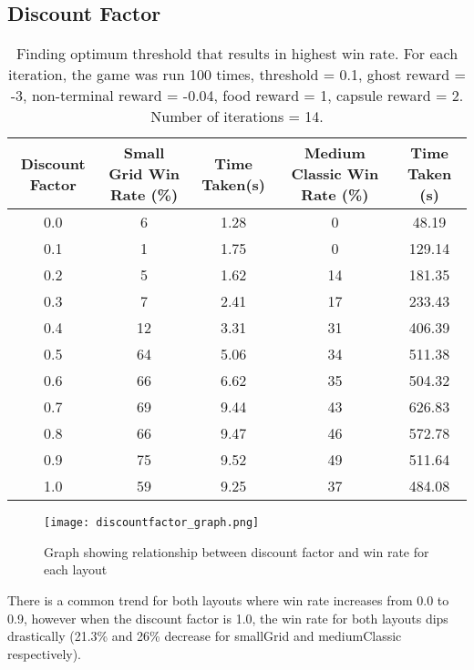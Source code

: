 \documentclass[12pt]{report}
\begin{document}
      \subsection*{Discount Factor}
        \begin{table}[H]
          \begin{center}
            \begin{adjustbox}{max width=\textwidth}
              \begin{tabular}{*{5}{c}}

                \textbf{Discount Factor} & \textbf{Small Grid Win Rate (\%)} & \textbf{Time Taken(s)} & \textbf{Medium Classic Win Rate (\%)} & \textbf{Time Taken (s)}\\
                \hline
                0.0 & 6 & 1.28 & 0 & 48.19\\
                0.1 & 1 & 1.75 & 0 & 129.14\\
                0.2 & 5 & 1.62 & 14 & 181.35\\
                0.3 & 7 & 2.41 & 17 & 233.43\\
                0.4 & 12 & 3.31 & 31 & 406.39\\
                0.5 & 64 & 5.06 & 34 & 511.38\\
                0.6 & 66 & 6.62 & 35 & 504.32\\
                0.7 & 69 & 9.44 & 43 & 626.83\\
                0.8 & 66 & 9.47 & 46 & 572.78\\
                0.9 & 75 & 9.52 & 49 & 511.64\\
                1.0 & 59 & 9.25 & 37 & 484.08\\
              \end{tabular}
            \end{adjustbox}
            \caption{Finding optimum threshold that results in highest win rate. For each iteration, the game was run 100 times, threshold = 0.1, ghost reward = -3, non-terminal reward = -0.04, food reward = 1, capsule reward = 2. Number of iterations = 14.}
              \label{tab:table4}
        \end{center}
      \end{table}
      \vspace{-13mm}
      \begin{figure}[H]
        \centering
        \texttt{[image: discountfactor\_graph.png]}
        \caption{Graph showing relationship between discount factor and win rate for each layout}
      \end{figure}
      There is a common trend for both layouts where win rate increases from 0.0 to 0.9, however when the discount factor is 1.0, the win rate for both layouts dips drastically (21.3\% and 26\% decrease for smallGrid and mediumClassic respectively).
\end{document}
